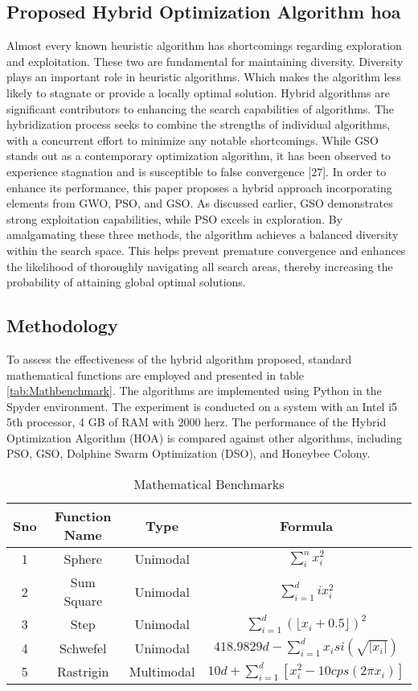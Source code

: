 \documentclass[conference]{IEEEtran}
\begin{document}
\begin{abstract1}
\section{Proposed Hybrid Optimization Algorithm hoa}\label{HOA}
Almost every known heuristic algorithm has shortcomings regarding exploration and exploitation. These two are fundamental for maintaining diversity. Diversity plays an important role in heuristic algorithms. Which makes the algorithm less likely to stagnate or provide a locally optimal solution\cite{Ullah2023}. 
Hybrid algorithms are significant contributors to enhancing the search capabilities of algorithms. The hybridization process seeks to combine the strengths of individual algorithms, with a concurrent effort to minimize any notable shortcomings.
While GSO stands out as a contemporary optimization algorithm, it has been observed to experience stagnation and is susceptible to false convergence [27]. In order to enhance its performance, this paper proposes a hybrid approach incorporating elements from GWO, PSO, and GSO. As discussed earlier, GSO demonstrates strong exploitation capabilities, while PSO excels in exploration. By amalgamating these three methods, the algorithm achieves a balanced diversity within the search space. This helps prevent premature convergence and enhances the likelihood of thoroughly navigating all search areas, thereby increasing the probability of attaining global optimal solutions.

\subsection{Methodology}
To assess the effectiveness of the hybrid algorithm proposed, standard mathematical functions are employed and presented in table \ref{tab:Mathbenchmark}. The algorithms are implemented using Python in the Spyder environment. The experiment is conducted on a system with an Intel i5 5th processor, 4 GB of RAM with 2000 herz. The performance of the Hybrid Optimization Algorithm (HOA) is compared against other algorithms, including PSO, GSO, Dolphine Swarm Optimization (DSO), and Honeybee Colony.

\begin{center}
	\begin{table}
		\caption{Mathematical Benchmarks}

	\begin{tabular}{ |c|c|c|c| } 
		\hline
		Sno & Function Name & Type & Formula \\ 
		\hline
		\rule{0pt}{15pt}
		1 & Sphere & Unimodal & $\sum_{i}^{n} x_i^2$  \\ 
			\rule{0pt}{15pt}
		2 & Sum Square & Unimodal &  $\sum_{i=1}^{d} ix_i^2$   \\
		 	\rule{0pt}{15pt}
		3 & Step & Unimodal &  $\sum_{i=1}^{d}(\lfloor x_i +0.5 \rfloor)^2$ \\
			\rule{0pt}{15pt}
		4 & Schwefel & Unimodal &  $418.9829d - \sum_{i=1}^{d}x_isi(\sqrt{|x_i|})$ \\
			\rule{0pt}{15pt} 
		5 & Rastrigin & Multimodal &  $10d + \sum_{i=1}^{d}[x_i^2-10 cps(2\pi x_i)]$   \\
		

\end{tabular}
\end{table}
\end{center}
\end{abstract1}
\end{document}
